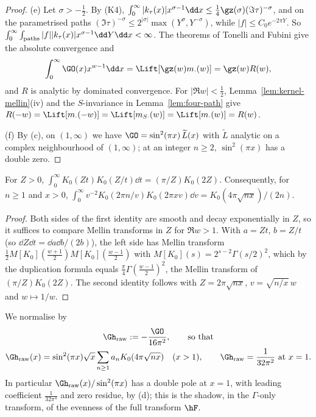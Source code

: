 \begin{proof}
(e) Let $\sigma>-\frac12$. By (K4), $\int_0^\infty|k_\tau(x)|x^{\sigma-1}\dd x\le\frac14\gz(\sigma)(\Im\tau)^{-\sigma}$, and on the parametrised paths
$(\Im\tau)^{-\sigma}\le2^{|\sigma|}\max(Y^\sigma,Y^{-\sigma})$, while $|f|\le C_0e^{-2\pi Y}$. So $\int_0^\infty\int_{\rm paths}|f||k_\tau(x)|x^{\sigma-1}\dd Y\dd x<\infty$.
The theorems of Tonelli and Fubini give the absolute convergence and
\[
\int_0^\infty\GO(x)x^{w-1}\dd x=\Lift[\gz(w)m_\cdot(w)]=\gz(w)R(w),
\]
and $R$ is analytic by dominated convergence. For $|\Re w|<\frac12$, Lemma~\ref{lem:kernel-mellin}(iv) and the $S$-invariance in Lemma~\ref{lem:four-path} give
$R(-w)=\Lift[m_\cdot(-w)]=\Lift[m_{S\cdot}(w)]=\Lift[m_\cdot(w)]=R(w)$.

(f) By (c), on $(1,\infty)$ we have $\GO=\sin^2(\pi x)\,\widetilde L(x)$ with $\widetilde L$ analytic on a complex neighbourhood of $(1,\infty)$; at an
integer $n\ge2$, $\sin^2(\pi x)$ has a double zero.
\end{proof}

\begin{lemma}\label{lem:K0K0}
For $Z>0$, $\int_0^\infty K_0(Zt)K_0(Z/t)\dd t=(\pi/Z)K_0(2Z)$. Consequently, for $n\ge1$ and $x>0$,
$\int_0^\infty v^{-2}K_0(2\pi n/v)K_0(2\pi xv)\dd v=K_0(4\pi\sqrt{nx})/(2n)$.
\end{lemma}

\begin{proof}
Both sides of the first identity are smooth and decay exponentially in $Z$, so it suffices to compare Mellin transforms in $Z$ for $\Re w>1$.
With $a=Zt$, $b=Z/t$ (so $\dd Z\dd t=\dd a\dd b/(2b)$), the left side has Mellin transform
$\frac12M[K_0](\frac{w+1}2)M[K_0](\frac{w-1}2)$ with $M[K_0](s)=2^{s-2}\Gamma(s/2)^2$, which by the duplication formula \cite[5.5.5]{DLMF} equals
$\frac\pi4\Gamma(\frac{w-1}2)^2$, the Mellin transform of $(\pi/Z)K_0(2Z)$. The second identity follows with $Z=2\pi\sqrt{nx}$, $v=\sqrt{n/x}\,w$ and
$w\mapsto1/w$.
\end{proof}

We normalise by
\begin{equation}\label{eq:Graw}
\begin{gathered}
\Gh_{\rm raw}:=-\frac{\GO}{16\pi^2},\qquad\text{so that}\\
\Gh_{\rm raw}(x)=\sin^2(\pi x)\sqrt x\sum_{n\ge1}a_nK_0(4\pi\sqrt{nx})\quad(x>1),\qquad \Gh_{\rm raw}=\frac1{32\pi^2}\ \text{at }x=1.
\end{gathered}
\end{equation}
In particular $\Gh_{\rm raw}(x)/\sin^2(\pi x)$ has a double pole at $x=1$, with leading coefficient $\frac1{32\pi^4}$ and zero residue, by (d);
this is the shadow, in the $\Gamma$-only transform, of the evenness of the full transform $\hF$.

